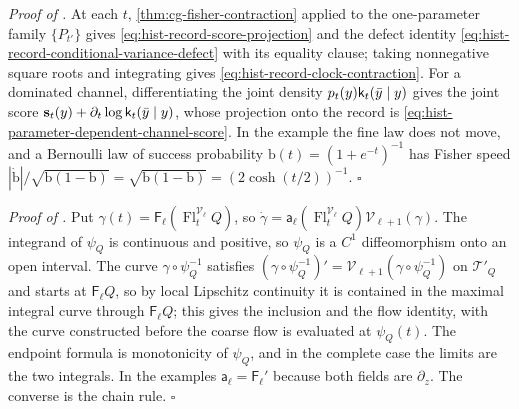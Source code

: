 \noindent\emph{Proof of .}
At each $t$, \cref{thm:cg-fisher-contraction} applied to the one-parameter family
$\{P_{t'}\}$ gives \eqref{eq:hist-record-score-projection} and the defect identity
\eqref{eq:hist-record-conditional-variance-defect} with its equality clause; taking
nonnegative square roots and integrating gives \eqref{eq:hist-record-clock-contraction}.
For a dominated channel, differentiating the joint density
$p_t(y)\mathsf k_t(\bar y\mid y)$ gives the joint score
$\mathbf s_t(y)+\partial_t\log\mathsf k_t(\bar y\mid y)$, whose projection onto the
record is \eqref{eq:hist-parameter-dependent-channel-score}.  In the example the fine
law does not move, and a Bernoulli law of success probability
$\mathrm b(t)=(1+e^{-t})^{-1}$ has Fisher speed
$|\dot{\mathrm b}|/\sqrt{\mathrm b(1-\mathrm b)}=\sqrt{\mathrm b(1-\mathrm b)}=(2\cosh(t/2))^{-1}$.
$\square$

\noindent\emph{Proof of .}
Put $\gamma(t)=\mathsf F_\ell(\operatorname{Fl}^{\mathscr V_\ell}_tQ)$, so
$\dot\gamma=\mathsf a_\ell(\operatorname{Fl}^{\mathscr V_\ell}_tQ)\mathscr
V_{\ell+1}(\gamma)$.  The integrand of $\psi_Q$ is continuous and positive, so $\psi_Q$ is
a $C^1$ diffeomorphism onto an open interval.  The curve $\gamma\circ\psi_Q^{-1}$
satisfies $(\gamma\circ\psi_Q^{-1})'=\mathscr V_{\ell+1}(\gamma\circ\psi_Q^{-1})$ on
$\mathcal T'_Q$ and starts at $\mathsf F_\ell Q$, so by local Lipschitz continuity it is
contained in the maximal integral curve through $\mathsf F_\ell Q$; this gives the
inclusion and the flow identity, with the curve constructed before the coarse flow is
evaluated at $\psi_Q(t)$.  The endpoint formula is monotonicity of $\psi_Q$, and in the
complete case the limits are the two integrals.  In the examples
$\mathsf a_\ell=\mathsf F_\ell'$ because both fields are $\partial_z$.  The converse is
the chain rule.  $\square$

